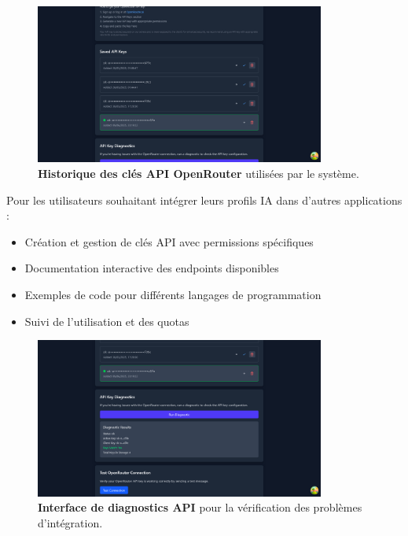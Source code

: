 \begin{figure}[H]
  \centering
  \includegraphics[width=0.85\textwidth,keepaspectratio]{pfe-pics/ai-profile-creation/oneRouter_keys_hestory.png}
  \caption{\textbf{Historique des clés API OpenRouter} utilisées par le système.}
  \label{fig:api_keys_history}
\end{figure}

Pour les utilisateurs souhaitant intégrer leurs profils IA dans d'autres applications :

\begin{itemize}
  \item Création et gestion de clés API avec permissions spécifiques
  \item Documentation interactive des endpoints disponibles
  \item Exemples de code pour différents langages de programmation
  \item Suivi de l'utilisation et des quotas
\end{itemize}

\begin{figure}[H]
  \centering
  \includegraphics[width=0.85\textwidth,keepaspectratio]{pfe-pics/ai-profile-creation/api_diagnostics.png}
  \caption{\textbf{Interface de diagnostics API} pour la vérification des problèmes d'intégration.}
  \label{fig:api_diagnostics}
\end{figure}

